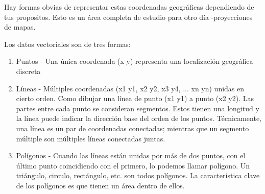 Hay formas obvias de representar estas coordenadas geográficas dependiendo de 
tus propositos. Esto es un área completa de estudio para otro día 
-proyecciones de mapas.

Los datos vectoriales son de tres formas:

\begin{enumerate}
\item Puntos - Una única coordenada (x y) representa una localización 
geográfica discreta
\item Líneas - Múltiples coordenadas (x1 y1, x2 y2, x3 y4, ... xn yn) unidas 
en cierto orden. Como dibujar una línea de punto (x1 y1) a punto (x2 y2). 
Las partes entre cada punto se consideran segmentos. Estos tienen una longitud 
y la línea puede indicar la dirección base del orden de los puntos. 
Técnicamente, una línea es un par de coordenadas conectadas; mientras que un 
segmento múltiple son múltiples líneas conectadas juntas.  
\item Polígonos - Cuando las líneas están unidas por más de dos puntos, con el 
último punto coincidiendo con el primero, lo podemos llamar polígono. 
Un triángulo, circulo, rectángulo, etc. son todos polígonos. La característica 
clave de los polígonos es que tienen un área dentro de ellos.  
\end{enumerate}

